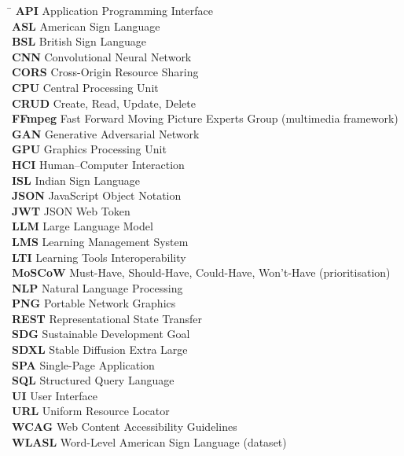 \documentclass[12pt,a4paper,oneside]{report}
\begin{document}
\begin{tabbing}
\hspace{3.5cm}\=\kill
\textbf{API}   \> Application Programming Interface \\
\textbf{ASL}   \> American Sign Language \\
\textbf{BSL}   \> British Sign Language \\
\textbf{CNN}   \> Convolutional Neural Network \\
\textbf{CORS}  \> Cross-Origin Resource Sharing \\
\textbf{CPU}   \> Central Processing Unit \\
\textbf{CRUD}  \> Create, Read, Update, Delete \\
\textbf{FFmpeg}\> Fast Forward Moving Picture Experts Group (multimedia framework) \\
\textbf{GAN}   \> Generative Adversarial Network \\
\textbf{GPU}   \> Graphics Processing Unit \\
\textbf{HCI}   \> Human--Computer Interaction \\
\textbf{ISL}   \> Indian Sign Language \\
\textbf{JSON}  \> JavaScript Object Notation \\
\textbf{JWT}   \> JSON Web Token \\
\textbf{LLM}   \> Large Language Model \\
\textbf{LMS}   \> Learning Management System \\
\textbf{LTI}   \> Learning Tools Interoperability \\
\textbf{MoSCoW}\> Must-Have, Should-Have, Could-Have, Won't-Have (prioritisation) \\
\textbf{NLP}   \> Natural Language Processing \\
\textbf{PNG}   \> Portable Network Graphics \\
\textbf{REST}  \> Representational State Transfer \\
\textbf{SDG}   \> Sustainable Development Goal \\
\textbf{SDXL}  \> Stable Diffusion Extra Large \\
\textbf{SPA}   \> Single-Page Application \\
\textbf{SQL}   \> Structured Query Language \\
\textbf{UI}    \> User Interface \\
\textbf{URL}   \> Uniform Resource Locator \\
\textbf{WCAG}  \> Web Content Accessibility Guidelines \\
\textbf{WLASL} \> Word-Level American Sign Language (dataset) \\
\end{tabbing}
\clearpage
\end{document}
